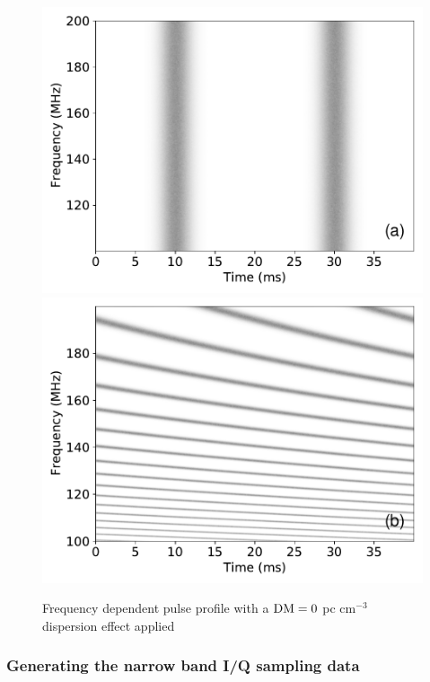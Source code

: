 \documentclass[fleqn,usenatbib]{mnras}
\begin{document}
 \begin{figure}
    \centering
    \includegraphics[width=0.9\columnwidth]{dm0_fb.pdf}
    \includegraphics[width=0.9\columnwidth]{dm1_fb.pdf}
    \caption{Frequency dependent pulse profile with a $\rm DM=0$ pc cm$^{-3}$ dispersion effect applied}
    \label{fig:fb}
 \end{figure}


\subsubsection{Generating the narrow band I/Q sampling data}
 
\end{document}
